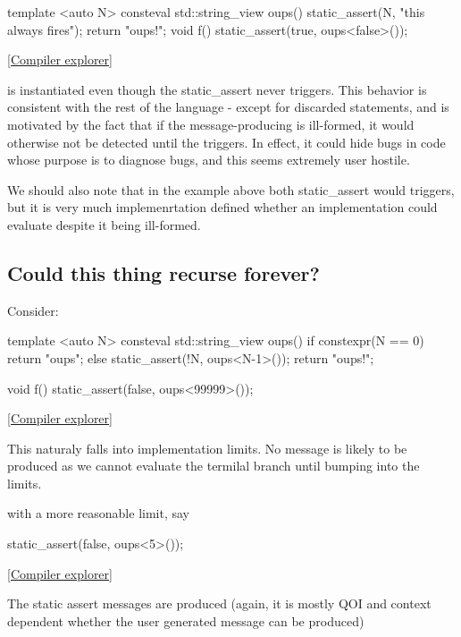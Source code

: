 \documentclass{wg21}
\begin{document}
\begin{colorblock}
template <auto N>
consteval std::string_view oups() {
    static_assert(N, "this always fires");
    return "oups!";
}
void f() {
    static_assert(true, oups<false>());
}
\end{colorblock}

\href{https://godbolt.org/z/PdvKsjTxq}{[Compiler explorer]}

 is instantiated even though the static_assert never triggers.
This behavior is consistent with the rest of the language - except for discarded statements, and is motivated by the fact that if the message-producing
is ill-formed, it would otherwise not be detected until the  triggers. In effect, it could hide bugs in code whose purpose is to diagnose bugs,
and this seems extremely user hostile.

We should also note that in the example above both static_assert would triggers, but it is very much implemenrtation defined whether an implementation could
evaluate  despite it being ill-formed.

\subsection{Could this thing recurse forever?}

Consider:

\begin{colorblock}
template <auto N>
consteval std::string_view oups() {
    if constexpr(N == 0)
        return "oups";
    else
        static_assert(!N, oups<N-1>());
    return "oups!";
}

void f() {
  static_assert(false, oups<99999>());
}
\end{colorblock}

\href{https://godbolt.org/z/Kc9cPbqz6}{[Compiler explorer]}

This naturaly falls into implementation limits.
No message is likely to be produced as we cannot evaluate the termilal branch until bumping into the limits.

with a more reasonable limit, say

\begin{colorblock}
static_assert(false, oups<5>());
\end{colorblock}

\href{https://godbolt.org/z/eqsj6GavG}{[Compiler explorer]}

The static assert messages are produced (again, it is mostly QOI and context dependent whether the user generated message can be produced)
\end{document}
